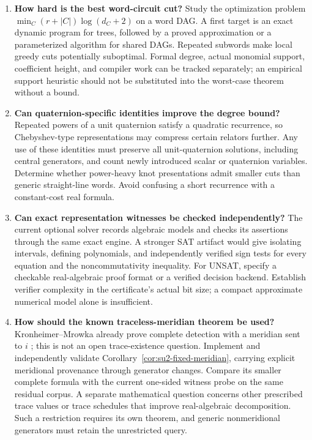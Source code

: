 \begin{enumerate}[label=\textbf{Q\arabic*.},leftmargin=3em,start=7]
\item \textbf{How hard is the best word-circuit cut?}
Study the optimization problem
$\min_C(r+|C|)\log(d_C+2)$ on a word DAG. A first target is an exact
dynamic program for trees, followed by a proved approximation or a
parameterized algorithm for shared DAGs. Repeated subwords make local
greedy cuts potentially suboptimal. Formal degree, actual monomial
support, coefficient height, and compiler work can be tracked separately;
an empirical support heuristic should not be substituted into the
worst-case theorem without a bound.

\item \textbf{Can quaternion-specific identities improve the degree bound?}
Repeated powers of a unit quaternion satisfy a quadratic recurrence, so
Chebyshev-type representations may compress certain relators further.
Any use of these identities must preserve all unit-quaternion solutions,
including central generators, and count newly introduced scalar or
quaternion variables. Determine whether power-heavy knot presentations
admit smaller cuts than generic straight-line words. Avoid confusing a
short recurrence with a constant-cost real formula.

\item \textbf{Can exact representation witnesses be checked independently?}
The current optional solver records algebraic models and checks its
assertions through the same exact engine. A stronger SAT artifact would
give isolating intervals, defining polynomials, and independently verified
sign tests for every equation and the noncommutativity inequality. For
UNSAT, specify a checkable real-algebraic proof format or a verified
decision backend. Establish verifier complexity in the certificate's
actual bit size; a compact approximate numerical model alone is insufficient.

\item \textbf{How should the known traceless-meridian theorem be used?}
Kronheimer--Mrowka already prove complete detection with a meridian
sent to $i$ \cite[Corollary~7.17]{KM2010Excision}; this is not an open
trace-existence question. Implement and independently validate
Corollary~\ref{cor:su2-fixed-meridian}, carrying explicit meridional
provenance through generator changes. Compare its smaller complete formula
with the current one-sided witness probe on the same residual corpus.
A separate mathematical question concerns other prescribed trace values
or trace schedules that improve real-algebraic decomposition. Such a
restriction requires its own theorem, and generic nonmeridional
generators must retain the unrestricted query.


\end{enumerate}
